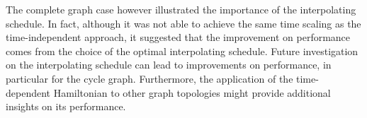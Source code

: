 \documentclass[11pt, twoside]{report}
\begin{document}
The complete graph case however illustrated the importance of the interpolating schedule. In fact, although it was not able to achieve the same time scaling as the time-independent approach, it suggested that the improvement on performance comes from the choice of the optimal interpolating schedule. Future investigation on the interpolating schedule can lead to improvements on performance, in particular for the cycle graph. Furthermore, the application of the time-dependent Hamiltonian to other graph topologies might provide additional insights on its performance.

\begin{comment}
	We then turn our attention to the cycle graph, the main graph topology considered. The standard quantum walk is not able to solve the search problem, thus making this graph an interesting starting point.\\

	In terms of localization we discover that the probability evaluated with the time-independent Hamiltonian does not increase with time, therefore it does not show localization properties. On the other hand, the time-dependent approach, given that it is based on the adiabatic implementation, for large $T$ -- far larger than the classical $O(N)$ search -- is able to achieve unitary probability. More interestingly, since the probability does not increase linearly, the solution of the search can be found with probability in the order of $p=0.8\div 0.9$ in much less time . \\


	We then study the search performance of the two approaches in terms of multiple runs search, since the search is not perfect for the time-independent Hamiltonian and the time is not optimized for the time-dependent one. To do so we introduce a new quantity which represents the minimum time necessary to get to unitary probability:
	\begin{equation*}
	  \tau = \min\Big(\frac{T}{p}\Big)_{T,\gamma}
	\end{equation*}
	and also consider the number of run iterations $I=\min(p^{-1})_{T,\gamma}$. \\Additionally, since the probability $p$ does not increase linearly with the time $T$, the quantity $\tau$ requires to consider a minimum time $T_{\min}$ to be effective at comparing the two approaches. To be consistent with the standar Grover's and the quantum walks search we set $T_{\min} = \pi/2\sqrt{N}$. \\



\end{comment}
\end{document}
